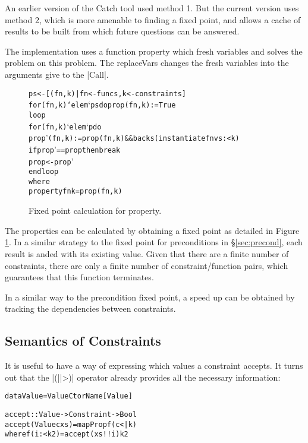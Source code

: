\documentclass[preprint]{sigplanconf}
\newcommand{\C}[1]{\textsf{#1}}
\newenvironment{code}{\begin{alltt}\small}{\end{alltt}}
\begin{document}
\begin{description}
    An earlier version of the Catch tool \citep{me:catch_tfp} used method 1. But the current version uses method 2, which is more amenable to finding a fixed point, and allows a cache of results to be built from which future questions can be answered.

    The implementation uses a function \C{property} which fresh variables and solves the problem on this problem. The \C{replaceVars} changes the fresh variables into the arguments give to the |Call|.

    \begin{figure}
    \begin{code}
    ps <- [(fn,k) | fn <- funcs, k <- constraints]
    for (fn,k) `elem` ps do prop(fn,k) := True
    loop
        for (fn,k) `elem` p do
            prop'(fn,k) := prop(fn,k) && backs (instantiate fn vs :< k)
        if prop' == prop then break
        prop <- prop'
    end loop
        where
            property fn k = prop(fn,k)
    \end{code}
    \caption{Fixed point calculation for \C{property}.}
    \label{fig:property_fixp}
    \end{figure}

    The properties can be calculated by obtaining a fixed point as detailed in Figure \ref{fig:property_fixp}. In a similar strategy to the fixed point for preconditions in \S\ref{sec:precond}, each result is anded with its existing value. Given that there are a finite number of constraints, there are only a finite number of constraint/function pairs, which guarantees that this function terminates.

    In a similar way to the precondition fixed point, a speed up can be obtained by tracking the dependencies between constraints.
\end{description}

\subsection{Semantics of Constraints}

It is useful to have a way of expressing which values a constraint accepts. It turns out that the |(||>)| operator already provides all the necessary information:

\begin{code}
data Value = Value CtorName [Value]

accept :: Value -> Constraint -> Bool
accept (Value c xs) = mapProp f (c <| k)
    where f (i :< k2) = accept (xs !! i) k2
\end{code}
\end{document}
